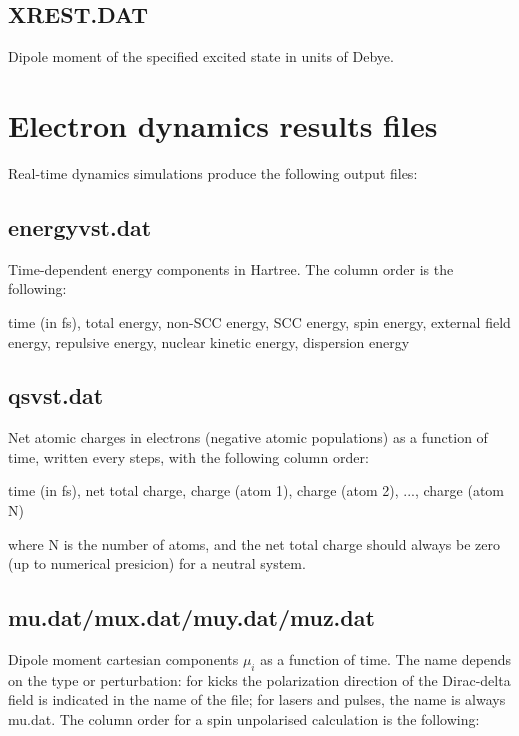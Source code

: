 \subsection{XREST.DAT}

Dipole moment of the specified excited state in units of Debye.

\section{Electron dynamics results files}
\label{sec:tddftb_rt}

Real-time dynamics simulations produce the following output files:

\subsection{energyvst.dat}

Time-dependent energy components in Hartree. The column order is the
following:

time (in fs), total energy, non-SCC energy, SCC energy, spin energy,
external field energy, repulsive energy, nuclear kinetic energy,
dispersion energy

\subsection{qsvst.dat}

Net atomic charges in electrons (negative atomic populations) as a
function of time, written every  steps, with the
following column order:

time (in fs), net total charge, charge (atom 1), charge (atom 2), ...,
charge (atom N)

where N is the number of atoms, and the net total charge should always
be zero (up to numerical presicion) for a neutral system.

\subsection{mu.dat/mux.dat/muy.dat/muz.dat}

Dipole moment cartesian components $\mu_i$ as a function of time. The
name depends on the type or perturbation: for kicks the polarization
direction of the Dirac-delta field is indicated in the name of the
file; for lasers and pulses, the name is always mu.dat. The column
order for a spin unpolarised calculation is the following:

